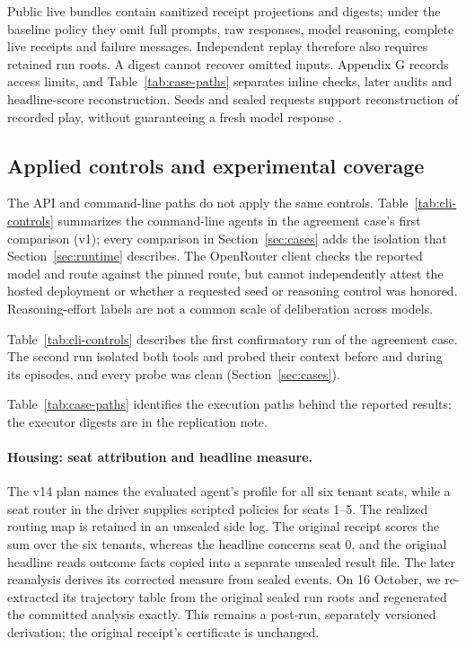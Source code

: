 Public live bundles contain sanitized receipt projections and digests;
under the baseline policy they omit full prompts, raw responses, model reasoning,
complete live receipts and failure messages. Independent replay therefore
also requires retained run roots. A digest cannot recover omitted inputs.
Appendix G records access limits, and Table~\ref{tab:case-paths} separates
inline checks, later audits and headline-score reconstruction. Seeds and
sealed requests support reconstruction of recorded play, without
guaranteeing a fresh model response \citep{he2025nondeterminism}.

\subsection{Applied controls and experimental coverage}
\label{app:runtime-cases}

The API and command-line paths do not apply the same controls. Table~\ref{tab:cli-controls}
summarizes the command-line agents in the agreement case's first comparison (v1); every comparison in Section~\ref{sec:cases} adds the isolation that Section~\ref{sec:runtime} describes. The OpenRouter
client checks the reported model and route against the pinned
route, but cannot independently attest the hosted deployment or whether a
requested seed or reasoning control was honored. Reasoning-effort labels
are not a common scale of deliberation across models.



Table~\ref{tab:cli-controls} describes the first confirmatory run of the agreement case. The
second run isolated both tools and probed their context before and during its
episodes, and every probe was clean (Section~\ref{sec:cases}).

Table~\ref{tab:case-paths} identifies the execution paths behind the reported
results; the executor digests are in the replication note.



\paragraph{Housing: seat attribution and headline measure.}
The v14 plan names the evaluated agent's profile for all six tenant seats, while
a seat router in the driver supplies scripted policies for seats 1--5.
The realized routing map is retained in an unsealed side log.
The original receipt scores the sum over the six tenants, whereas the headline
concerns seat 0, and the original headline reads outcome facts
copied into a separate unsealed result file. The later
reanalysis derives its
corrected measure from sealed events. On 16 October, we re-extracted its trajectory table
from the original sealed run roots and regenerated the committed
analysis exactly. This remains a post-run, separately
versioned derivation; the original receipt's certificate is unchanged.

